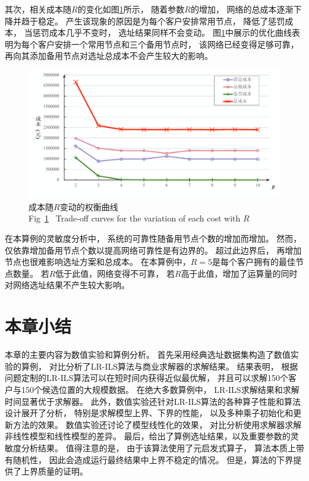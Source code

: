 其次，相关成本随$R$的变化如图\ref{fig:sens_r}所示，
随着参数$R$的增加，
网络的总成本逐渐下降并趋于稳定。
产生该现象的原因是为每个客户安排常用节点，
降低了惩罚成本，
当惩罚成本几乎不变时，
选址结果同样不会变动。
图\ref{fig:sens_r}中展示的优化曲线表明为每个客户安排一个常用节点和三个备用节点时，
该网络已经变得足够可靠，
再向其添加备用节点对选址总成本不会产生较大的影响。

\begin{figure}[hbt] %
	\setlength{\belowcaptionskip}{-0.5cm} 
	  \centering
	  \includegraphics[width = 0.9 \textwidth]{figures/sens_r.pdf}
	  \caption{成本随$R$变动的权衡曲线\\
	  Fig~\ref{fig:sens_r}~ Trade-off curves for the variation of each cost with $R$}
	  \label{fig:sens_r}
\end{figure}

在本算例的灵敏度分析中，
系统的可靠性随备用节点个数的增加而增加。
然而，仅依靠增加备用节点个数以提高网络可靠性是有边界的。
超过此边界后，
再增加节点也很难影响选址方案和总成本。
在本算例中，$R=5$是每个客户拥有的最佳节点数量。
若$R$低于此值，网络变得不可靠，
若$R$高于此值，增加了运算量的同时对网络选址结果不产生较大影响。

\section{本章小结}
\label{sec:本章小结5}
本章的主要内容为数值实验和算例分析。
首先采用经典选址数据集构造了数值实验的算例，
对比分析了LR-ILS算法与商业求解器的求解结果。
结果表明，
根据问题定制的LR-ILS算法可以在短时间内获得近似最优解，
并且可以求解150个客户与150个候选位置的大规模数据。
在绝大多数算例中，
LR-ILS求解结果和求解时间显著优于求解器。
此外，数值实验还针对LR-ILS算法的各种算子性能和算法设计展开了分析，
特别是求解模型上界、下界的性能，
以及多种乘子初始化和更新方法的效果。
数值实验还讨论了模型线性化的效果，
对比分析使用求解器求解非线性模型和线性模型的差异。
最后，给出了算例选址结果，以及重要参数的灵敏度分析结果。
值得注意的是，
由于该算法使用了元启发式算子，
算法本质上带有随机性，
因此会造成运行最终结果中上界不稳定的情况。
但是，算法的下界提供了上界质量的证明。

